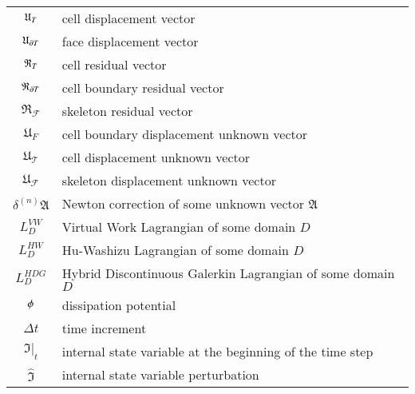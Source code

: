 \begin{longtable}{c l}
    \\
    $\mathfrak{U}{}_{T}$ & cell displacement vector
    \\
    $\mathfrak{U}{}_{\partial T}$ & face displacement vector
    \\
    $\mathfrak{R}{}_{T}$ & cell residual vector
    \\
    $\mathfrak{R}{}_{\partial T}$ & cell boundary residual vector
    \\
    $\mathfrak{R}{}_{\mathcal{F}}$ & skeleton residual vector
    \\
    $\mathfrak{U}{}_{F}$ & cell boundary displacement unknown vector
    \\
    $\mathfrak{U}{}_{\mathcal{T}}$ & cell displacement unknown vector
    \\
    $\mathfrak{U}{}_{\mathcal{F}}$ & skeleton displacement unknown vector
    \\
    $\delta^{(n)} \mathfrak{A}$ & Newton correction of some unknown vector $\mathfrak{A}$
    \\
    $L_{D}^{VW}$ & Virtual Work Lagrangian of some domain $D$
    \\
    $L_{D}^{HW}$ & Hu-Washizu Lagrangian of some domain $D$
    \\
    $L_{D}^{HDG}$ & Hybrid Discontinuous Galerkin Lagrangian of some domain $D$
    \\
    $\phi$ & dissipation potential
    \\
    $\Delta t$ & time increment
    \\
    $\mathfrak{I} \vert_{t}$ & internal state variable at the beginning of the time step
    \\
    $\hat{\mathfrak{I}}$ & internal state variable perturbation
    \\
    \hline
\end{longtable}
